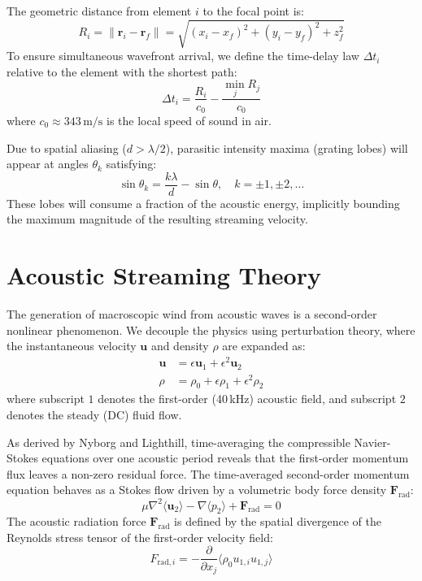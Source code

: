 \documentclass[journal, 10pt]{IEEEtran}
\begin{document}
The geometric distance from element $i$ to the focal point is:
\begin{equation}
    R_i = \|\mathbf{r}_i - \mathbf{r}_f\| = \sqrt{(x_i - x_f)^2 + (y_i - y_f)^2 + z_f^2}
\end{equation}
To ensure simultaneous wavefront arrival, we define the time-delay law $\Delta t_i$ relative to the element with the shortest path:
\begin{equation}
    \Delta t_i = \frac{R_i}{c_0} - \frac{\min_j R_j}{c_0}
\end{equation}
where $c_0 \approx 343\,\text{m/s}$ is the local speed of sound in air.

Due to spatial aliasing ($d > \lambda/2$), parasitic intensity maxima (grating lobes) will appear at angles $\theta_k$ satisfying:
\begin{equation}
    \sin\theta_k = \frac{k\lambda}{d} - \sin\theta, \quad k=\pm 1, \pm 2, \dots
\end{equation}
These lobes will consume a fraction of the acoustic energy, implicitly bounding the maximum magnitude of the resulting streaming velocity.

\section{Acoustic Streaming Theory}
The generation of macroscopic wind from acoustic waves is a second-order nonlinear phenomenon. We decouple the physics using perturbation theory, where the instantaneous velocity $\mathbf{u}$ and density $\rho$ are expanded as:
\begin{align}
    \mathbf{u} &= \epsilon \mathbf{u}_1 + \epsilon^2 \mathbf{u}_2 \\
    \rho &= \rho_0 + \epsilon \rho_1 + \epsilon^2 \rho_2
\end{align}
where subscript $1$ denotes the first-order (40\,kHz) acoustic field, and subscript $2$ denotes the steady (DC) fluid flow.

As derived by Nyborg and Lighthill, time-averaging the compressible Navier-Stokes equations over one acoustic period reveals that the first-order momentum flux leaves a non-zero residual force. The time-averaged second-order momentum equation behaves as a Stokes flow driven by a volumetric body force density $\mathbf{F}_{\text{rad}}$:
\begin{equation}
    \mu\nabla^2\langle \mathbf{u}_2 \rangle - \nabla \langle p_2 \rangle + \mathbf{F}_{\text{rad}} = 0
\end{equation}
The acoustic radiation force $\mathbf{F}_{\text{rad}}$ is defined by the spatial divergence of the Reynolds stress tensor of the first-order velocity field:
\begin{equation}
    F_{\text{rad},i} = -\frac{\partial}{\partial x_j} \bigl\langle \rho_0 u_{1,i} u_{1,j} \bigr\rangle
\end{equation}
\end{document}

